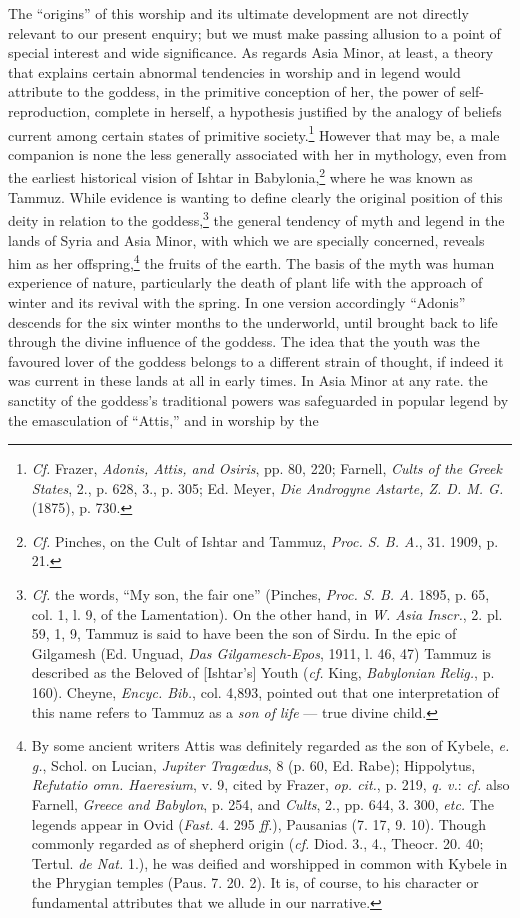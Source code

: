 \documentclass[a4paper, 11pt, oneside, polutonikogreek, english]{article}
\begin{document}
The ``origins'' of this worship and its ultimate development are not directly relevant to our present enquiry; but we must make passing allusion to a point of special interest and wide significance. As regards Asia Minor, at least, a theory that explains certain abnormal tendencies in worship and in legend would attribute to the goddess, in the primitive conception of her, the power of self-reproduction, complete in herself, a hypothesis justified by the analogy of beliefs current among certain states of primitive society.\footnote{\emph{Cf.} Frazer, \emph{Adonis, Attis, and Osiris}, pp. 80, 220; Farnell, \emph{Cults of the Greek States}, 2., p. 628, 3., p. 305; Ed. Meyer, \emph{Die Androgyne Astarte, Z. D. M. G.} (1875), p. 730.} However that may be, a male companion is none the less generally associated with her in mythology, even from the earliest historical vision of Ishtar in Babylonia,\footnote{\emph{Cf.} Pinches, on the Cult of Ishtar and Tammuz, \emph{Proc. S. B. A.}, 31. 1909, p. 21.} where he was known as Tammuz. While evidence is wanting to define clearly the original position of this deity in relation to the goddess,\footnote{\emph{Cf.} the words, ``My son, the fair one'' (Pinches, \emph{Proc. S. B. A.} 1895, p. 65, col. 1, l. 9, of the Lamentation). On the other hand, in \emph{W. Asia Inscr.}, 2. pl. 59, 1, 9, Tammuz is said to have been the son of Sirdu. In the epic of Gilgamesh (Ed. Unguad, \emph{Das Gilgamesch-Epos}, 1911, l. 46, 47) Tammuz is described as the Beloved of [Ishtar's] Youth (\emph{cf.} King, \emph{Babylonian Relig.}, p. 160). Cheyne, \emph{Encyc. Bib.}, col. 4,893, pointed out that one interpretation of this name refers to Tammuz as a \emph{son of life} --- true divine child.} the general tendency of myth and legend in the lands of Syria and Asia Minor, with which we are specially concerned, reveals him as her offspring,\footnote{By some ancient writers Attis was definitely regarded as the son of Kybele, \emph{e. g.}, Schol. on Lucian, \emph{Jupiter Tragœdus}, 8 (p. 60, Ed. Rabe); Hippolytus, \emph{Refutatio omn. Haeresium}, v. 9, cited by Frazer, \emph{op. cit.}, p. 219, \emph{q. v.}: \emph{cf.} also Farnell, \emph{Greece and Babylon}, p. 254, and \emph{Cults}, 2., pp. 644, 3. 300, \emph{etc.} The legends appear in Ovid (\emph{Fast.} 4. 295 \emph{ff.}), Pausanias (7. 17, 9. 10). Though commonly regarded as of shepherd origin (\emph{cf.} Diod. 3., 4., Theocr. 20. 40; Tertul. \emph{de Nat.} 1.), he was deified and worshipped in common with Kybele in the Phrygian temples (Paus. 7. 20. 2). It is, of course, to his character or fundamental attributes that we allude in our narrative.} the fruits of the earth. The basis of the myth was human experience of nature, particularly the death of plant life with the approach of winter and its revival with the spring. In one version accordingly ``Adonis'' descends for the six winter months to the underworld, until brought back to life through the divine influence of the goddess. The idea that the youth was the favoured lover of the goddess belongs to a different strain of thought, if indeed it was current in these lands at all in early times. In Asia Minor at any rate. the sanctity of the goddess's traditional powers was safeguarded in popular legend by the emasculation of ``Attis,'' and in worship by the 
\end{document}
